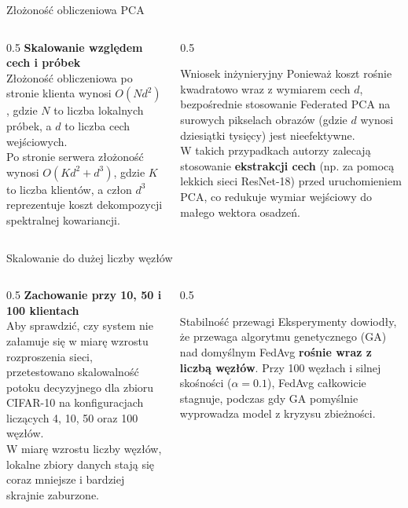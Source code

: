 \documentclass[9pt,aspectratio=169]{beamer}
\begin{document}
\begin{frame}{Złożoność obliczeniowa PCA}
\begin{columns}[T]
\begin{column}{0.5\textwidth}
\textbf{Skalowanie względem cech i próbek}\\[4pt]
Złożoność obliczeniowa po stronie klienta wynosi $O(Nd^2)$, gdzie $N$ to liczba lokalnych próbek, a $d$ to liczba cech wejściowych.\\[6pt]
Po stronie serwera złożoność wynosi $O(Kd^2+d^3)$, gdzie $K$ to liczba klientów, a człon $d^3$ reprezentuje koszt dekompozycji spektralnej kowariancji.
\end{column}
\begin{column}{0.5\textwidth}
\begin{infoboxgreen}{Wniosek inżynieryjny}
Ponieważ koszt rośnie kwadratowo wraz z wymiarem cech $d$, bezpośrednie stosowanie Federated PCA na surowych pikselach obrazów (gdzie $d$ wynosi dziesiątki tysięcy) jest nieefektywne.\\[6pt]
W takich przypadkach autorzy zalecają stosowanie \textbf{ekstrakcji cech} (np. za pomocą lekkich sieci ResNet-18) przed uruchomieniem PCA, co redukuje wymiar wejściowy do małego wektora osadzeń.
\end{infoboxgreen}
\end{column}
\end{columns}
\end{frame}

\begin{frame}{Skalowanie do dużej liczby węzłów}
\begin{columns}[T]
\begin{column}{0.5\textwidth}
\textbf{Zachowanie przy 10, 50 i 100 klientach}\\[4pt]
Aby sprawdzić, czy system nie załamuje się w miarę wzrostu rozproszenia sieci, przetestowano skalowalność potoku decyzyjnego dla zbioru CIFAR-10 na konfiguracjach liczących 4, 10, 50 oraz 100 węzłów.\\[6pt]
W miarę wzrostu liczby węzłów, lokalne zbiory danych stają się coraz mniejsze i bardziej skrajnie zaburzone.
\end{column}
\begin{column}{0.5\textwidth}
\begin{infobox}{Stabilność przewagi}
Eksperymenty dowiodły, że przewaga algorytmu genetycznego (GA) nad domyślnym FedAvg \textbf{rośnie wraz z liczbą węzłów}. Przy 100 węzłach i silnej skośności ($\alpha=0.1$), FedAvg całkowicie stagnuje, podczas gdy GA pomyślnie wyprowadza model z kryzysu zbieżności.
\end{infobox}
\end{column}
\end{columns}
\end{frame}
\end{document}
